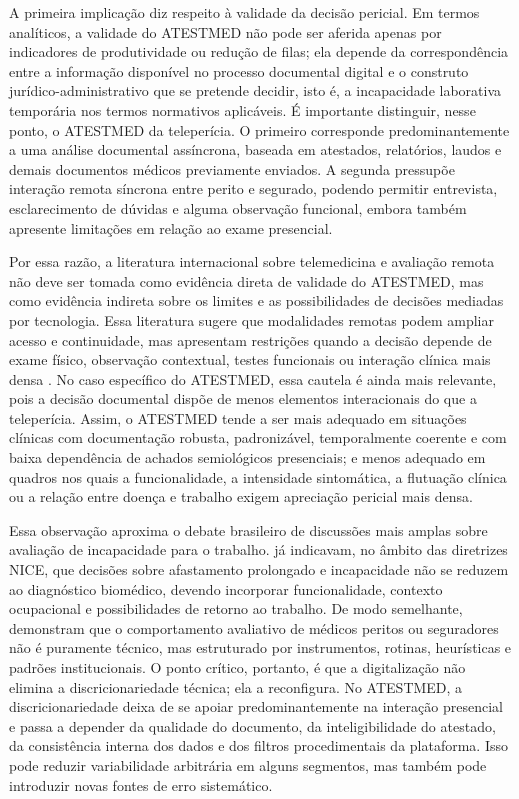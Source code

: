 \documentclass[12pt,a4paper]{article}
\begin{document}
A primeira implicação diz respeito à validade da decisão pericial. Em termos analíticos, a validade do ATESTMED não pode ser aferida apenas por indicadores de produtividade ou redução de filas; ela depende da correspondência entre a informação disponível no processo documental digital e o construto jurídico-administrativo que se pretende decidir, isto é, a incapacidade laborativa temporária nos termos normativos aplicáveis. É importante distinguir, nesse ponto, o ATESTMED da teleperícia. O primeiro corresponde predominantemente a uma análise documental assíncrona, baseada em atestados, relatórios, laudos e demais documentos médicos previamente enviados. A segunda pressupõe interação remota síncrona entre perito e segurado, podendo permitir entrevista, esclarecimento de dúvidas e alguma observação funcional, embora também apresente limitações em relação ao exame presencial.

Por essa razão, a literatura internacional sobre telemedicina e avaliação remota não deve ser tomada como evidência direta de validade do ATESTMED, mas como evidência indireta sobre os limites e as possibilidades de decisões mediadas por tecnologia. Essa literatura sugere que modalidades remotas podem ampliar acesso e continuidade, mas apresentam restrições quando a decisão depende de exame físico, observação contextual, testes funcionais ou interação clínica mais densa \parencite{ftouni2022challengesoftelemedicineduringthecovid19pandemica}. No caso específico do ATESTMED, essa cautela é ainda mais relevante, pois a decisão documental dispõe de menos elementos interacionais do que a teleperícia. Assim, o ATESTMED tende a ser mais adequado em situações clínicas com documentação robusta, padronizável, temporalmente coerente e com baixa dependência de achados semiológicos presenciais; e menos adequado em quadros nos quais a funcionalidade, a intensidade sintomática, a flutuação clínica ou a relação entre doença e trabalho exigem apreciação pericial mais densa.

Essa observação aproxima o debate brasileiro de discussões mais amplas sobre avaliação de incapacidade para o trabalho. \textcite{gabbay2011niceguidanceonlongtermsicknessandincapacity} já indicavam, no âmbito das diretrizes NICE, que decisões sobre afastamento prolongado e incapacidade não se reduzem ao diagnóstico biomédico, devendo incorporar funcionalidade, contexto ocupacional e possibilidades de retorno ao trabalho. De modo semelhante, \textcite{steenbeek2011thedevelopmentofinstrumentstomeasuretheworkdisa} demonstram que o comportamento avaliativo de médicos peritos ou seguradores não é puramente técnico, mas estruturado por instrumentos, rotinas, heurísticas e padrões institucionais. O ponto crítico, portanto, é que a digitalização não elimina a discricionariedade técnica; ela a reconfigura. No ATESTMED, a discricionariedade deixa de se apoiar predominantemente na interação presencial e passa a depender da qualidade do documento, da inteligibilidade do atestado, da consistência interna dos dados e dos filtros procedimentais da plataforma. Isso pode reduzir variabilidade arbitrária em alguns segmentos, mas também pode introduzir novas fontes de erro sistemático.
\end{document}
